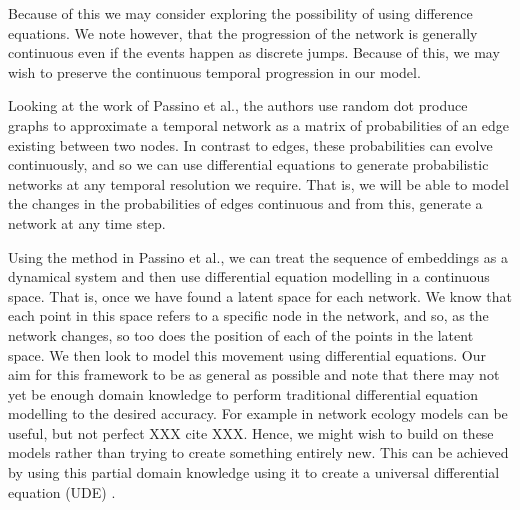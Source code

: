 \documentclass[12pt]{amsart}
\begin{document}
    Because of this we may consider exploring the possibility of using difference equations. We note however, that the progression of the network is generally continuous even if the events happen as discrete jumps. Because of this, we may wish to preserve the continuous temporal progression in our model.
    
    
    Looking at the work of Passino et al.\cite{sanna2021link}, the authors use random dot produce graphs\cite{athreya2017statistical} to approximate a temporal network as a matrix of probabilities of an edge existing between two nodes. In contrast to edges, these probabilities can evolve continuously, and so we can use differential equations to generate probabilistic networks at any temporal resolution we require. That is, we will be able to model the changes in the probabilities of edges continuous and from this, generate a network at any time step.

    Using the method in Passino et al.\cite{sanna2021link}, we can treat the sequence of embeddings as a dynamical system and then use differential equation modelling in a continuous space. That is, once we have found a latent space for each network. We know that each point in this space refers to a specific node in the network, and so, as the network changes, so too does the position of each of the points in the latent space. We then look to model this movement using differential equations. Our aim for this framework to be as general as possible and note that there may not yet be enough domain knowledge to perform traditional differential equation modelling to the desired accuracy. For example in network ecology models can be useful, but not perfect XXX cite XXX. Hence, we might wish to build on these models rather than trying to create something entirely new. This can be achieved by using this partial domain knowledge using it to create a universal differential equation (UDE) \cite{SciML_C_Rak}.
\end{document}

